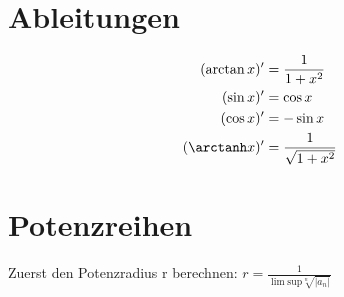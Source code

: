 \documentclass[a4paper,10pt]{article}
\begin{document}
\section{Ableitungen}
\begin{align*}
	(\arctan x)' &= \frac {1}{1 + x^2} \\
	(\sin x)'    &= \cos x \\
	(\cos x)'    &= -\sin x \\
	(\arctanh x)' &= \frac {1}{\sqrt {1 + x^2}}
\end{align*}


\section{Potenzreihen}
Zuerst den Potenzradius r berechnen:
\(
	r = \frac {1}{\lim \text{sup} \sqrt[n]{|a_n|}}
\)
\end{document}
